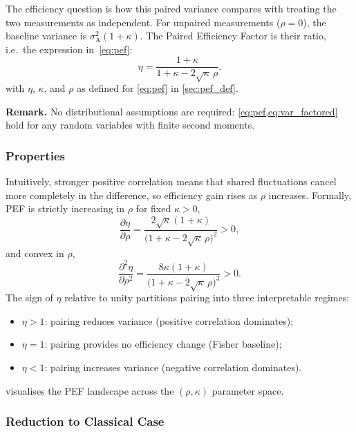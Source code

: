 The efficiency question is how this paired variance compares with treating the two measurements as independent. For unpaired measurements ($\rho=0$), the baseline variance is $\sigma^{2}_{\mathrm{A}}(1+\kappa)$. The Paired Efficiency Factor is their ratio, i.e.\ the expression in~\cref{eq:pef}:
\begin{equation*}
  \eta = \frac{1+\kappa}{1+\kappa-2\sqrt{\kappa}\,\rho}.
\end{equation*}
\noindent with $\eta$, $\kappa$, and $\rho$ as defined for \cref{eq:pef} in \cref{sec:pef_def}.

\medskip
\noindent\textbf{Remark.} No distributional assumptions are required: \cref{eq:pef,eq:var_factored} hold for any random variables with finite second moments.

\subsubsection{Properties}

Intuitively, stronger positive correlation means that shared fluctuations cancel more completely in the difference, so efficiency gain rises as $\rho$ increases. Formally, PEF is strictly increasing in $\rho$ for fixed $\kappa>0$,
\begin{equation}
  \frac{\partial \eta}{\partial \rho} = \frac{2\sqrt{\kappa}(1+\kappa)}{\bigl(1+\kappa-2\sqrt{\kappa}\,\rho\bigr)^{2}} > 0,
  \label{eq:detadrho}
\end{equation}
and convex in $\rho$,
\begin{equation}
  \frac{\partial^{2} \eta}{\partial \rho^{2}} = \frac{8\kappa(1+\kappa)}{\bigl(1+\kappa-2\sqrt{\kappa}\,\rho\bigr)^{3}} > 0.
  \label{eq:d2etadrho2}
\end{equation}
The sign of $\eta$ relative to unity partitions pairing into three interpretable regimes:
\begin{itemize}
  \item $\eta>1$: pairing reduces variance (positive correlation dominates);
  \item $\eta=1$: pairing provides no efficiency change (Fisher baseline);
  \item $\eta<1$: pairing increases variance (negative correlation dominates).
\end{itemize}
 visualises the PEF landscape across the $(\rho,\kappa)$ parameter space.

\subsubsection{Reduction to Classical Case}

